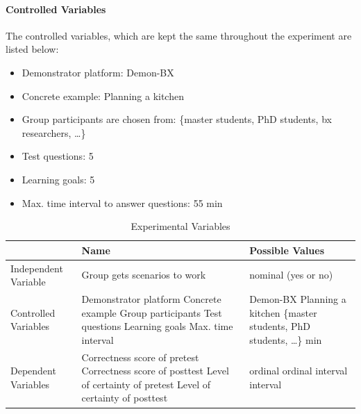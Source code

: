 \paragraph{Controlled Variables} The controlled variables, which are kept the same throughout the experiment are listed below:

\begin{itemize}
	\item Demonstrator platform: Demon-BX
	\item Concrete example: Planning a kitchen
	\item Group participants are chosen from: \{master students, PhD students, bx researchers, \ldots \}
	\item Test questions: 5
	\item Learning goals: 5
	\item Max. time interval to answer questions: 55 min
\end{itemize}

\begin{table}[h]
	\centering	
	\begin{tabular}{|p{4cm}|p{5cm}|p{6cm}|}
		\hline
		\rowcolor[gray]{.8}	
		\textbf{} & \textbf{Name} & \textbf{Possible Values} \\
		\hline
		Independent Variable & Group gets scenarios to work & nominal (yes or no)\\
		\hline
		Controlled Variables & 
		Demonstrator platform 
		\newline Concrete example
		\newline Group participants
		\newline Test questions
		\newline Learning goals
		\newline Max. time interval	&
		Demon-BX
		\newline Planning a kitchen 
		\newline \{master students, PhD students, \ldots \}
		\newline 5
		\newline 5
		\newline 55 min \\
		\hline	
		Dependent Variables & 
		Correctness score of pretest
		\newline Correctness score of posttest 
		\newline Level of certainty of pretest
		\newline Level of certainty of posttest & 
		ordinal
		\newline ordinal
		\newline interval
		\newline interval \\
		\hline				
		
	\end{tabular}
	\caption{Experimental Variables}
	\label{tab:Experimental_Variables}
\end{table}

